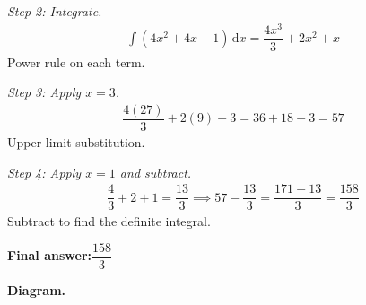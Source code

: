 \documentclass[11pt]{article}
\begin{document}
\textit{Step 2: Integrate.}
\[\begin{gathered}
\int (4x^2 + 4x + 1)\, \mathrm{d}x = \dfrac{4x^3}{3} + 2x^2 + x
\end{gathered}\]
Power rule on each term.

\textit{Step 3: Apply \( x = 3 \).}
\[\begin{gathered}
\dfrac{4(27)}{3} + 2(9) + 3 = 36 + 18 + 3 = 57
\end{gathered}\]
Upper limit substitution.

\textit{Step 4: Apply \( x = 1 \) and subtract.}
\[\begin{gathered}
\dfrac{4}{3} + 2 + 1 = \dfrac{13}{3} \implies 57 - \dfrac{13}{3} = \dfrac{171 - 13}{3} = \dfrac{158}{3}
\end{gathered}\]
Subtract to find the definite integral.

\begin{answerbox}
\textbf{Final answer:}\quad \(\displaystyle \dfrac{158}{3}\)
\end{answerbox}
\textbf{Diagram.}
\end{document}
